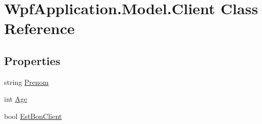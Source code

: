 \hypertarget{class_wpf_application_1_1_model_1_1_client}{\section{Wpf\-Application.\-Model.\-Client Class Reference}
\label{class_wpf_application_1_1_model_1_1_client}
}
\subsection*{Properties}
\begin{DoxyCompactItemize}
\item 
string \hyperlink{class_wpf_application_1_1_model_1_1_client_a3f49a129721a9bfffb482de1658c88f7}{Prenom}
\item 
int \hyperlink{class_wpf_application_1_1_model_1_1_client_a6f8385b0794898f510b0711eb2f69d20}{Age}
\item 
bool \hyperlink{class_wpf_application_1_1_model_1_1_client_a40ac23eaedeb2a7b54e626e0f5b205bc}{Est\-Bon\-Client}
\end{DoxyCompactItemize}



